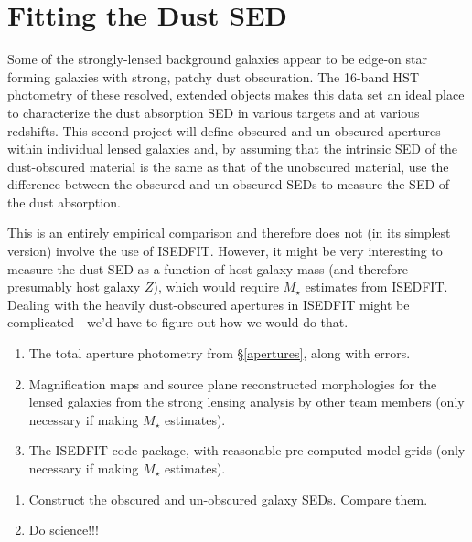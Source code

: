 \documentclass[preprint,12pt]{aastex}
\begin{document}

\section{Fitting the Dust SED}\label{dust_fit}

Some of the strongly-lensed background galaxies appear to be edge-on
star forming galaxies with strong, patchy dust obscuration.  The
16-band HST photometry of these resolved, extended objects makes this
data set an ideal place to characterize the dust absorption SED in
various targets and at various redshifts.  This second project will
define obscured and un-obscured apertures within individual lensed
galaxies and, by assuming that the intrinsic SED of the dust-obscured
material is the same as that of the unobscured material, use the
difference between the obscured and un-obscured SEDs to measure the
SED of the dust absorption.  

This is an entirely empirical comparison and therefore does not (in
its simplest version) involve the use of ISEDFIT.  However, it might
be very interesting to measure the dust SED as a function of host
galaxy mass (and therefore presumably host galaxy $Z$), which would
require $M_{\star}$ estimates from ISEDFIT.  Dealing with the heavily
dust-obscured apertures in ISEDFIT might be complicated---we'd have to
figure out how we would do that.


\vspace{0.08in}
\vspace{-0.1in}
\begin{enumerate}\itemsep-6pt
\item {The total aperture photometry from \S\ref{apertures}, along
  with errors.}
\item {Magnification maps and source plane reconstructed morphologies
  for the lensed galaxies from the strong lensing analysis by other
  team members (only necessary if making $M_{\star}$ estimates).}
\item {The ISEDFIT code package, with reasonable pre-computed model
  grids (only necessary if making $M_{\star}$ estimates).}
\end{enumerate}

\vspace{-0.1in}
\begin{enumerate}\itemsep-6pt
\item {Construct the obscured and un-obscured galaxy SEDs.  Compare
  them.}
\item {Do science!!!}
\end{enumerate}
\end{document}
